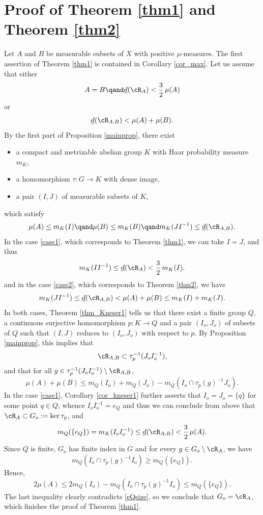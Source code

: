 \section{Proof of Theorem \ref{thm1} and Theorem \ref{thm2}}

Let $A$ and $B$ be measurable subsets of $X$ with positive $\mu$-measures. The first assertion of Theorem \ref{thm1} is contained
in Corollary \ref{cor_max}. Let us assume that either
\begin{equation}
\label{case1}
A = B \qand \underline{d}(\cR_{A}) < \frac{3}{2}\, \mu(A)
\end{equation}
or
\begin{equation}
\label{case2}
\underline{d}(\cR_{A,B}) < \mu(A) + \mu(B).
\end{equation}
By the first part of Proposition \ref{mainprop}, there exist
\begin{itemize}
\item a compact and metrizable abelian group $K$ with Haar probability measure $m_K$,
\item a homomorphism $\tau : G \to K$ with dense image,
\item a pair $(I,J)$ of measurable subsets of $K$,
\end{itemize}
which satisfy
\[
\mu(A) \leq m_K(I) \qand \mu(B) \leq m_K(B) \qand m_K(JI^{-1}) \leq \underline{d}(\cR_{A,B}).
\]
In the case \eqref{case1}, which corresponds to Theorem \ref{thm1}, we can take $I = J$, and thus
\[
m_K(II^{-1}) \leq \underline{d}(\cR_{A}) < \frac{3}{2} \, m_K(I).
\]
and in the case \eqref{case2}, which corresponds to Theorem \ref{thm2}, we have
\[
m_K(JI^{-1}) \leq \underline{d}(\cR_{A,B}) < \mu(A) + \mu(B) \leq m_K(I) + m_K(J).
\]
In both cases, Theorem \ref{thm_Kneser1} tells us that there exist a finite group $Q$, a continuous surjective homomorphism
$p : K \to Q$ and a pair $(I_o,J_o)$ of subsets of $Q$ such that $(I,J)$ reduces to $(I_o,J_o)$ with respect to $p$.
By Proposition \ref{mainprop}, this implies that
\[
\cR_{A,B} \subset \tau_p^{-1}(J_o I_o^{-1}),
\]
and that for all $g \in \tau_p^{-1}(J_o I_o^{-1}) \setminus \cR_{A,B}$,
\[
\mu(A) + \mu(B) \leq m_Q(I_o) + m_Q(J_o) - m_Q(I_o \cap \tau_p(g)^{-1}J_o).
\]
In the case \eqref{case1}, Corollary \ref{cor_kneser1} further asserts that $I_o = J_o = \{q\}$ for some point $q \in Q$, whence
$I_o I_o^{-1} = e_Q$ and thus we can conclude from above that $\cR_{A} \subset G_o := \ker \tau_p$, and
\begin{equation}
\label{eQsize}
m_Q(\{e_Q\}) = m_K(I_o I_o^{-1}) \leq \underline{d}(\cR_{A,B}) < \frac{3}{2}\, \mu(A).
\end{equation}
Since $Q$ is finite, $G_o$ has finite index in $G$ and for every $g \in G_o \setminus \cR_A$, we have
\[
m_Q(I_o \cap \tau_p(g)^{-1}I_o) \geq m_Q(\{e_Q\}).
\]
Hence,
\[
2\mu(A) \leq 2m_Q(I_o) - m_Q(I_o \cap \tau_p(g)^{-1}I_o) \leq m_Q(\{e_Q\}).
\]
The last inequality clearly contradicts \eqref{eQsize}, so we conclude that $G_o = \cR_A$, which finishes the proof of Theorem \ref{thm1}.


